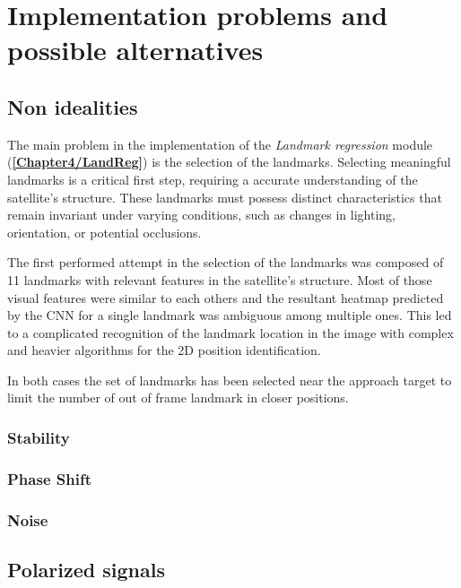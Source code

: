 \section{Implementation problems and possible alternatives}

\subsection{Non idealities}
\label{Chapter4/LandmarksSel}
The main problem in the implementation of the \textit{Landmark regression} module (\textbf{\ref{Chapter4/LandReg}}) is the selection of the landmarks.
Selecting meaningful landmarks is a critical first step, requiring a accurate understanding of the satellite's structure. These landmarks must possess distinct characteristics that remain invariant under varying conditions, such as changes in lighting, orientation, or potential occlusions.

The first performed attempt in the selection of the landmarks was composed of 11 landmarks with relevant features in the satellite's structure. Most of those visual features were similar to each others and the resultant heatmap predicted by the CNN for a single landmark was ambiguous among multiple ones. This led to a complicated recognition of the landmark location in the image with complex and heavier algorithms for the 2D position identification.

In both cases the set of landmarks has been selected near the approach target to limit the number of out of frame landmark in closer positions.

\subsubsection{Stability}

\subsubsection{Phase Shift}

\subsubsection{Noise}

\subsection{Polarized signals}

